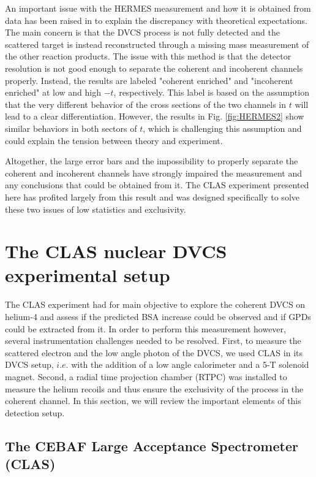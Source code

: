 \documentclass[aps,prc,preprint,superscriptaddress]{revtex4}
\begin{document}
An important issue with the HERMES measurement and how it is obtained from data has been raised in
\cite{Guzey:2003jh} to explain the discrepancy with theoretical expectations.
The main concern is that the DVCS process is not fully detected and the scattered target
is instead reconstructed through a missing mass measurement of the other reaction products. The 
issue with this method is that the detector resolution is not good enough to separate the 
coherent and incoherent channels properly. 
Instead, the results are labeled "coherent enriched" and "incoherent enriched" at low and high 
$-t$, respectively. This label is based on the assumption that the very different behavior of the
cross sections of the two channels in $t$ will lead to a clear differentiation. However, the
results in Fig. \ref{fig:HERMES2} show similar behaviors in both sectors of $t$, which is 
challenging this assumption and could explain the tension between theory and experiment. 

Altogether, the large error bars and the impossibility to properly separate the coherent and 
incoherent channels have strongly impaired the measurement and any conclusions that could be
obtained from it. The CLAS experiment presented here has profited largely from this
result and was designed specifically to solve these two issues of low statistics and exclusivity.

\section{The CLAS nuclear DVCS experimental setup}

The CLAS experiment had for main objective to explore the coherent DVCS on helium-4 and assess if
the predicted BSA increase could be observed and if GPDs could be extracted from it. In order to
perform this measurement however, several instrumentation challenges needed to be resolved. First, to
measure the scattered electron and the low angle photon of the DVCS, we used CLAS in its 
DVCS setup, $i.e.$ with the addition of a low angle calorimeter and a 5-T solenoid magnet. Second, a
radial time projection chamber (RTPC) was installed to measure the
helium recoils and thus ensure the exclusivity of the process in the coherent channel. In this section, we 
will review the important elements of this detection setup. 

\subsection{The CEBAF Large Acceptance Spectrometer (CLAS)}
\end{document}
